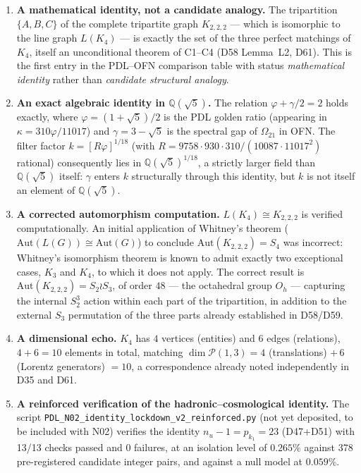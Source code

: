 \documentclass[11pt,a4paper]{article}
\theoremstyle{plain}
\theoremstyle{definition}
\theoremstyle{remark}
\newcommand{\Kfour}{K_4}
\begin{document}
\begin{enumerate}[label=(\roman*)]
\item \textbf{A mathematical identity, not a candidate analogy.} The tripartition $\{A,B,C\}$ of the complete tripartite graph $K_{2,2,2}$ --- which is isomorphic to the line graph $L(\Kfour)$ --- is exactly the set of the three perfect matchings of $\Kfour$, itself an unconditional theorem of C1--C4 (D58 Lemma~L2, D61). This is the first entry in the PDL--OFN comparison table with status \emph{mathematical identity} rather than \emph{candidate structural analogy}.
\item \textbf{An exact algebraic identity in $\mathbb{Q}(\sqrt{5})$.} The relation $\varphi + \gamma/2 = 2$ holds exactly, where $\varphi=(1+\sqrt{5})/2$ is the PDL golden ratio (appearing in $\kappa=310\varphi/11017$) and $\gamma=3-\sqrt{5}$ is the spectral gap of $\Omega_{21}$ in OFN. The filter factor $k=[R\varphi]^{1/18}$ (with $R=9758\cdot930\cdot310/(10087\cdot11017^2)$ rational) consequently lies in $\mathbb{Q}(\sqrt{5})^{1/18}$, a strictly larger field than $\mathbb{Q}(\sqrt{5})$ itself: $\gamma$ enters $k$ structurally through this identity, but $k$ is not itself an element of $\mathbb{Q}(\sqrt{5})$.
\item \textbf{A corrected automorphism computation.} $L(\Kfour) \cong K_{2,2,2}$ is verified computationally. An initial application of Whitney's theorem ($\mathrm{Aut}(L(G))\cong\mathrm{Aut}(G)$) to conclude $\mathrm{Aut}(K_{2,2,2})=S_4$ was incorrect: Whitney's isomorphism theorem is known to admit exactly two exceptional cases, $K_3$ and $K_4$, to which it does not apply. The correct result is $\mathrm{Aut}(K_{2,2,2}) = S_2\wr S_3$, of order $48$ --- the octahedral group $O_h$ --- capturing the internal $S_2^3$ action within each part of the tripartition, in addition to the external $S_3$ permutation of the three parts already established in D58/D59.
\item \textbf{A dimensional echo.} $\Kfour$ has $4$ vertices (entities) and $6$ edges (relations), $4+6=10$ elements in total, matching $\dim\mathcal{P}(1,3) = 4$ (translations) $+\,6$ (Lorentz generators) $=10$, a correspondence already noted independently in D35 and D61.
\item \textbf{A reinforced verification of the hadronic--cosmological identity.} The script \texttt{PDL\_N02\_identity\_lockdown\_v2\_reinforced.py} (not yet deposited, to be included with N02) verifies the identity $n_u-1=p_{k_1}=23$ (D47+D51) with 13/13 checks passed and 0 failures, at an isolation level of $0.265\%$ against 378 pre-registered candidate integer pairs, and against a null model at $0.059\%$.
\end{enumerate}
\end{document}
